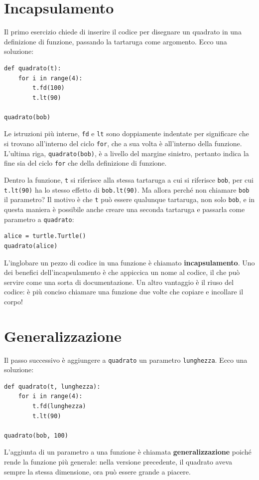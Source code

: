 \documentclass[10pt]{book}
\begin{document}
\section{Incapsulamento}

Il primo esercizio chiede di inserire il codice per disegnare un quadrato in una definizione di funzione, passando la tartaruga come argomento. Ecco una soluzione:

\begin{verbatim}
def quadrato(t):
    for i in range(4):
        t.fd(100)
        t.lt(90)

quadrato(bob)
\end{verbatim}
%
Le istruzioni più interne, {\tt fd} e {\tt lt} sono doppiamente indentate per significare che si trovano all'interno del ciclo {\tt for}, che a sua volta è all'interno della funzione. L'ultima riga, {\tt quadrato(bob)}, è a livello del margine sinistro, pertanto indica la fine sia del ciclo {\tt for} che della definizione di funzione.

Dentro la funzione, {\tt t} si riferisce alla stessa tartaruga a cui si riferisce {\tt bob}, per cui {\tt t.lt(90)} ha lo stesso effetto di {\tt bob.lt(90)}.
Ma allora perché non chiamare {\tt bob} il parametro? Il motivo è che {\tt t}
può essere qualunque tartaruga, non solo {\tt bob}, e in questa maniera è possibile anche creare una seconda tartaruga e passarla come parametro a {\tt quadrato}:

\begin{verbatim}
alice = turtle.Turtle()
quadrato(alice)
\end{verbatim}
%
L'inglobare un pezzo di codice in una funzione è chiamato {\bf incapsulamento}. Uno dei benefici dell'incapsulamento è che appiccica un nome al codice, il che può servire come una sorta di documentazione. Un altro vantaggio è il riuso del codice: è più conciso chiamare una funzione due volte che copiare e incollare il corpo!


\section{Generalizzazione}

Il passo successivo è aggiungere a {\tt quadrato} un parametro {\tt lunghezza}.
Ecco una soluzione:

\begin{verbatim}
def quadrato(t, lunghezza):
    for i in range(4):
        t.fd(lunghezza)
        t.lt(90)

quadrato(bob, 100)
\end{verbatim}
%
L'aggiunta di un parametro a una funzione è chiamata {\bf generalizzazione}
poiché rende la funzione più generale: nella versione precedente, il quadrato aveva sempre la stessa dimensione, ora può essere grande a piacere.
\end{document}
